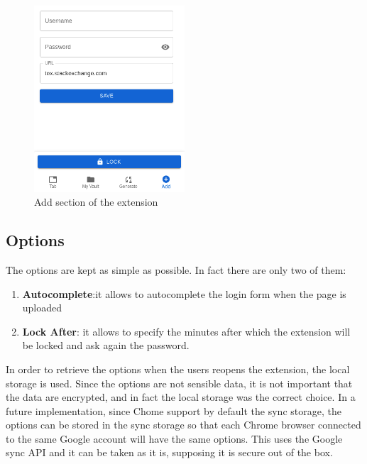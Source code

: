 \begin{figure}[h!]
    \centering
    \vspace{0.5cm}
    \includegraphics[width=0.5\textwidth]{images/extension/add.png}
    \caption{Add section of the extension}
    \label{fig:add} %
\end{figure}


\subsection{Options}

The options are kept as simple as possible. In fact there are only two of them:

\begin{enumerate}
    \item \textbf{Autocomplete}:it allows to autocomplete the login form when the page is uploaded
    \item \textbf{Lock After}: it allows to specify the minutes after which the extension will be locked and ask again the password.
\end{enumerate}

In order to retrieve the options when the users reopens the extension, the local storage is used. Since the options are not sensible data, it is not important that the data are encrypted, and in fact the local storage was the correct choice. In a future implementation, since Chome support by default the sync storage, the options can be stored in the sync storage so that each Chrome browser connected to the same Google account will have the same options. This uses the Google sync API and it can be taken as it is, supposing it is secure out of the box. 

